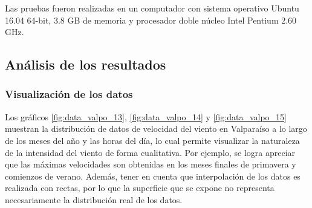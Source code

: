 Las pruebas fueron realizadas en un computador con sistema operativo Ubuntu 16.04 64-bit, 3.8 GB de memoria y procesador doble núcleo Intel Pentium 2.60 GHz. 

\subsection{Análisis de los resultados}
\subsubsection{Visualización de los datos}
Los gráficos \ref{fig:data_valpo_13}, \ref{fig:data_valpo_14} y \ref{fig:data_valpo_15} muestran la distribución de datos de velocidad del viento en Valparaíso a lo largo de los meses del año y las horas del día, lo cual permite visualizar la naturaleza de la intensidad del viento de forma cualitativa.
Por ejemplo, se logra apreciar que las máximas velocidades son obtenidas en los meses finales de primavera y comienzos de verano. Además, tener en cuenta que interpolación de los datos es realizada con rectas, por lo que la superficie que se expone no representa necesariamente la distribución real de los datos.\\

